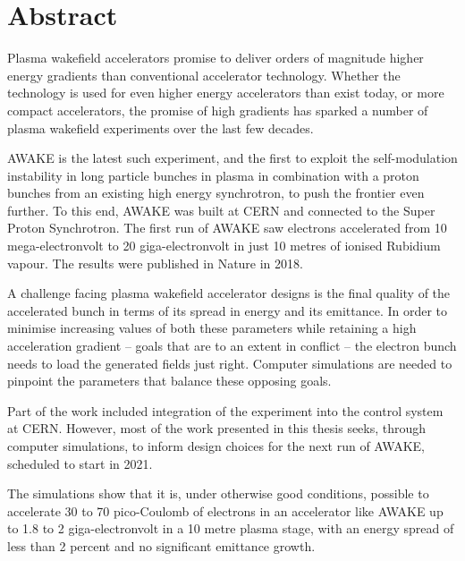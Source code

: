 \chapter*{Abstract}
\label{Abstract}

Plasma wakefield accelerators promise to deliver orders of magnitude higher energy gradients than conventional accelerator technology. Whether the technology is used for even higher energy accelerators than exist today, or more compact accelerators, the promise of high gradients has sparked a number of plasma wakefield experiments over the last few decades.

AWAKE is the latest such experiment, and the first to exploit the self-modulation instability in long particle bunches in plasma in combination with a proton bunches from an existing high energy synchrotron, to push the frontier even further. To this end, AWAKE was built at CERN and connected to the Super Proton Synchrotron. The first run of AWAKE saw electrons accelerated from 10 mega-electronvolt to 20 giga-electronvolt in just 10 metres of ionised Rubidium vapour. The results were published in Nature in 2018.

A challenge facing plasma wakefield accelerator designs is the final quality of the accelerated bunch in terms of its spread in energy and its emittance. In order to minimise increasing values of both these parameters while retaining a high acceleration gradient – goals that are to an extent in conflict – the electron bunch needs to load the generated fields just right. Computer simulations are needed to pinpoint the parameters that balance these opposing goals.

Part of the work included integration of the experiment into the control system at CERN. However, most of the work presented in this thesis seeks, through computer simulations, to inform design choices for the next run of AWAKE, scheduled to start in 2021. 

The simulations show that it is, under otherwise good conditions, possible to accelerate 30 to 70 pico-Coulomb of electrons in an accelerator like AWAKE up to 1.8 to 2 giga-electronvolt in a 10 metre plasma stage, with an energy spread of less than 2 percent and no significant emittance growth.
